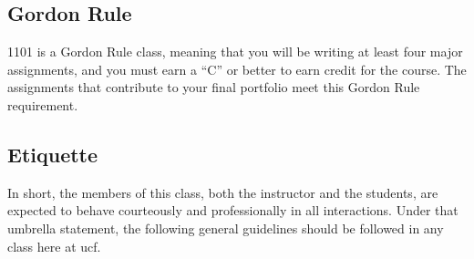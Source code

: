 \documentclass[11pt,oneside]{amsart}	%
\begin{document}
\subsection{Gordon Rule} %
\label{sub:gordon_rule}
\ac{1101} is a Gordon Rule class, meaning that you will be writing at least four major assignments, and you must earn a ``C'' or better to earn credit for the course. The assignments that contribute to your final portfolio meet this Gordon Rule requirement.



\subsection{Etiquette}
In short, the members of this class, both the instructor and the students, are expected to behave courteously and professionally in all interactions.  Under that umbrella statement, the following general guidelines should be followed in any class here at \ac{ucf}.
\end{document}
